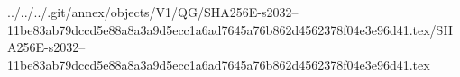 ../../../.git/annex/objects/V1/QG/SHA256E-s2032--11be83ab79dccd5e88a8a3a9d5ecc1a6ad7645a76b862d4562378f04e3e96d41.tex/SHA256E-s2032--11be83ab79dccd5e88a8a3a9d5ecc1a6ad7645a76b862d4562378f04e3e96d41.tex